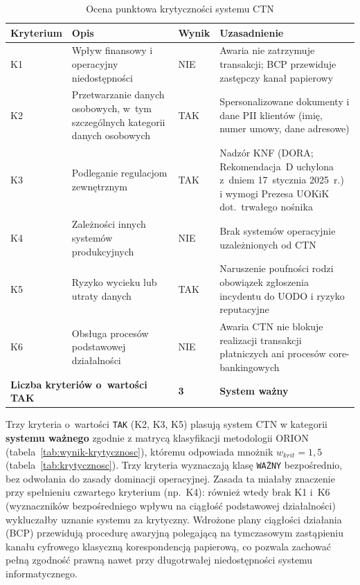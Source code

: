 \begin{table}[H]
\centering
\caption{Ocena punktowa krytyczności systemu CTN}
\renewcommand{\arraystretch}{1.4}
\begin{tabular}{p{2.1cm} p{5.2cm} p{1.4cm} p{5cm}}
\toprule
\textbf{Kryterium} & \textbf{Opis} & \textbf{Wynik} & \textbf{Uzasadnienie} \\
\midrule
K1 & Wpływ finansowy i operacyjny niedostępności & NIE & Awaria nie zatrzymuje transakcji; BCP przewiduje zastępczy kanał papierowy \\
\midrule
K2 & Przetwarzanie danych osobowych, w~tym szczególnych kategorii danych osobowych & TAK & Spersonalizowane dokumenty i dane PII klientów (imię, numer umowy, dane adresowe) \\
\midrule
K3 & Podleganie regulacjom zewnętrznym & TAK & Nadzór KNF (DORA; Rekomendacja~D uchylona z~dniem 17~stycznia 2025~r.) i wymogi Prezesa UOKiK dot.\ trwałego nośnika \\
\midrule
K4 & Zależności innych systemów produkcyjnych & NIE & Brak systemów operacyjnie uzależnionych od CTN \\
\midrule
K5 & Ryzyko wycieku lub utraty danych & TAK & Naruszenie poufności rodzi obowiązek zgłoszenia incydentu do UODO i ryzyko reputacyjne \\
\midrule
K6 & Obsługa procesów podstawowej działalności & NIE & Awaria CTN nie blokuje realizacji transakcji płatniczych ani procesów core-bankingowych \\
\midrule
\multicolumn{2}{l}{\textbf{Liczba kryteriów o~wartości TAK}} & \textbf{3} & \textbf{System ważny} \\
\bottomrule
\end{tabular}
\end{table}

Trzy kryteria o~wartości \texttt{TAK} (K2, K3, K5) plasują system CTN w kategorii \textbf{systemu ważnego} zgodnie z matrycą klasyfikacji metodologii ORION (tabela~\ref{tab:wynik-krytycznosc}), któremu odpowiada mnożnik $w_{krit} = 1{,}5$ (tabela~\ref{tab:krytycznosc}). Trzy kryteria wyznaczają klasę \texttt{WAŻNY} bezpośrednio, bez odwołania do zasady dominacji operacyjnej. Zasada ta miałaby znaczenie przy spełnieniu czwartego kryterium (np.\ K4): również wtedy brak K1 i~K6 (wyznaczników bezpośredniego wpływu na ciągłość podstawowej działalności) wykluczałby uznanie systemu za krytyczny. Wdrożone plany ciągłości działania (BCP) przewidują procedurę awaryjną polegającą na tymczasowym zastąpieniu kanału cyfrowego klasyczną korespondencją papierową, co pozwala zachować pełną zgodność prawną nawet przy długotrwałej niedostępności systemu informatycznego.


